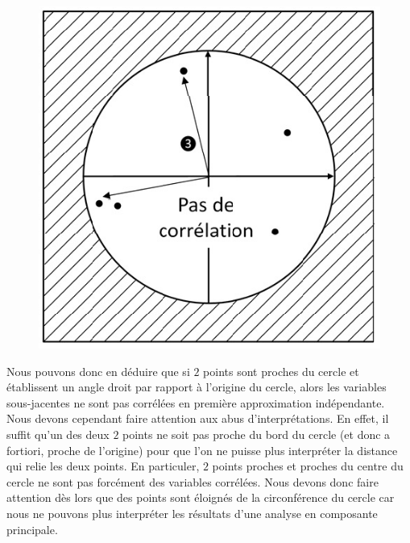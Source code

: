 \begin{figure}[H]\begin{center}\includegraphics[scale=0.5]{ilu/hyperProjdPi.png}\end{center}\end{figure}

Nous pouvons donc en déduire que si $2$ points sont proches du cercle et établissent un angle droit par rapport à l'origine du cercle, alors les variables sous-jacentes ne sont pas corrélées en première approximation indépendante.\newline
\\
Nous devons cependant faire attention aux abus d'interprétations. En effet, il suffit qu'un des deux $2$ points ne soit pas proche du bord du cercle (et donc a fortiori, proche de l'origine) pour que l'on ne puisse plus interpréter la distance qui relie les deux points. En particuler, $2$ points proches et proches du centre du cercle ne sont pas forcément des variables corrélées. Nous devons donc faire attention dès lors que des points sont éloignés de la circonférence du cercle car nous ne pouvons plus interpréter les résultats d'une analyse en composante principale.

